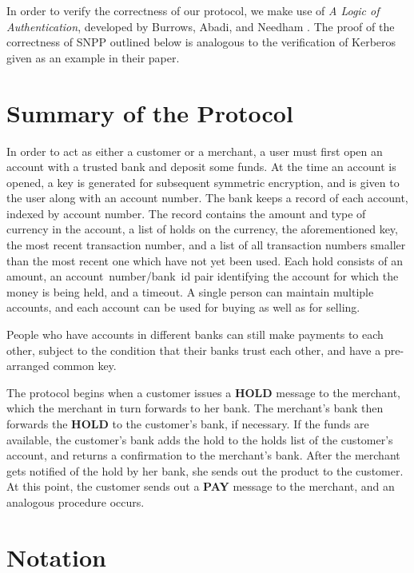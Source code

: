 In order to verify the correctness of our protocol, we make use of
{\it A Logic of Authentication}, developed by Burrows, Abadi, and Needham
\cite{kn:burrows89}.  The proof of the correctness of SNPP outlined below
is analogous to the verification of Kerberos given as an example in
their paper.

\section{Summary of the Protocol}

In order to act as either a customer or a merchant, a user must first
open an account with a trusted bank and deposit some funds.  At the
time an account is opened, a key is generated for subsequent symmetric
encryption, and is given to the user along with an account number.
The bank keeps a record of each account, indexed by account number.
The record contains the amount and type of currency in the account, a
list of holds on the currency, the aforementioned key, the most recent
transaction number, and a list of all transaction numbers smaller than
the most recent one which have not yet been used.  Each hold consists
of an amount, an account~number/bank~id pair identifying the account
for which the money is being held, and a timeout.  A single person can
maintain multiple accounts, and each account can be used for buying as
well as for selling.

People who have accounts in different banks can still make payments to each
other, subject to
the condition that their banks trust each other, and have a pre-arranged
common key.

The protocol begins when a customer issues a {\bf HOLD} message to the
merchant, which the merchant in turn forwards to her bank.  The
merchant's bank then forwards the {\bf HOLD} to the customer's bank,
if necessary.  If the funds are available, the customer's bank adds
the hold to the holds list of the customer's account, and returns a
confirmation to the merchant's bank.  After the merchant gets notified
of the hold by her bank, she sends out the product to the customer.
At this point, the customer sends out a {\bf PAY} message to the
merchant, and an analogous procedure occurs.

\section{Notation}

